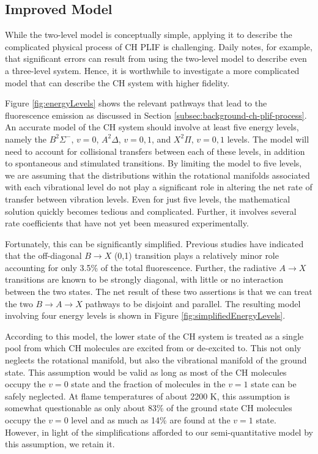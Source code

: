 \subsection{Improved Model}
\label{subsec:chplif-improved-model}

While the two-level model is conceptually simple, applying it to describe the complicated physical process of CH PLIF is challenging.
Daily\cite{1997-daily} notes, for example, that significant errors can result from using the two-level model to describe even a three-level system.
Hence, it is worthwhile to investigate a more complicated model that can describe the CH system with higher fidelity.

Figure \ref{fig:energyLevels} shows the relevant pathways that lead to the fluorescence emission as discussed in Section \ref{subsec:background-ch-plif-process}.
An accurate model of the CH system should involve at least five energy levels, namely the \(B^2\Sigma^-\), \(v=0\), \(A^2\Delta\), \(v=0,1\), and \(X^2\Pi\), \(v=0,1\) levels.
The model will need to account for collisional transfers between each of these levels, in addition to spontaneous and stimulated transitions.
By limiting the model to five levels, we are assuming that the distributions within the rotational manifolds associated with each vibrational level do not play a significant role in altering the net rate of transfer between vibration levels.
Even for just five levels, the mathematical solution quickly becomes tedious and complicated.
Further, it involves several rate coefficients that have not yet been measured experimentally.



Fortunately, this can be significantly simplified.
Previous studies\cite{1996-luque-c,2000-luque} have indicated that the off-diagonal \(B\rightarrow X\) (0,1) transition plays a relatively minor role accounting for only 3.5\% of the total fluorescence.
Further, the radiative \(A\rightarrow X\) transitions are known\cite{1996-luque-b} to be strongly diagonal, with little or no interaction\cite{1985-garland-b} between the two states.
The net result of these two assertions is that we can treat the two \(B\rightarrow A\rightarrow X\) pathways to be disjoint and parallel.
The resulting model involving four energy levels is shown in Figure \ref{fig:simplifiedEnergyLevels}.



According to this model, the lower state of the CH system is treated as a single pool from which CH molecules are excited from or de-excited to.
This not only neglects the rotational manifold, but also the vibrational manifold of the ground state.
This assumption would be valid as long as most of the CH molecules occupy the \(v=0\) state and the fraction of molecules in the \(v=1\) state can be safely neglected.
At flame temperatures of about 2200 K, this assumption is somewhat questionable as only about 83\% of the ground state CH molecules occupy the \(v=0\) level and as much as 14\% are found at the \(v=1\) state.
However, in light of the simplifications afforded to our semi-quantitative model by this assumption, we retain it.

